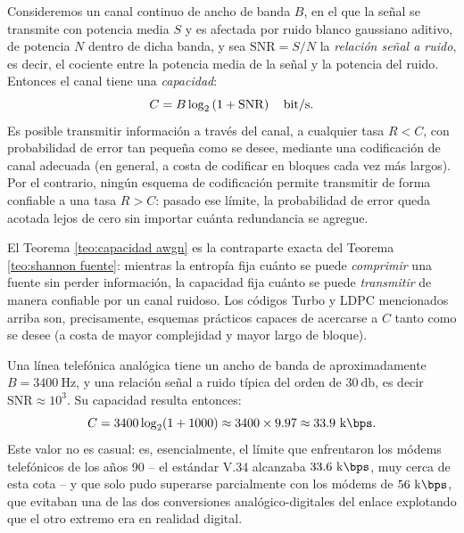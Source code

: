 \begin{teorema}\label{teo:capacidad awgn}
Consideremos un canal continuo de ancho de banda $B$, en el que la señal se transmite con potencia media $S$ y es afectada por ruido blanco gaussiano aditivo, de potencia $N$ dentro de dicha banda, y sea $\mathrm{SNR}=S/N$ la \emph{relación señal a ruido}, es decir, el cociente entre la potencia media de la señal y la potencia del ruido. Entonces el canal tiene una \emph{capacidad}:
\begin{equation*}
    C = B\log_2\left(1+\mathrm{SNR}\right) \quad \unit{\bit/\second}.
\end{equation*}
Es posible transmitir información a través del canal, a cualquier tasa $R<C$, con probabilidad de error tan pequeña como se desee, mediante una codificación de canal adecuada (en general, a costa de codificar en bloques cada vez más largos). Por el contrario, ningún esquema de codificación permite transmitir de forma confiable a una tasa $R>C$: pasado ese límite, la probabilidad de error queda acotada lejos de cero sin importar cuánta redundancia se agregue.
\end{teorema}

El Teorema \ref{teo:capacidad awgn} es la contraparte exacta del Teorema \ref{teo:shannon fuente}: mientras la entropía fija cuánto se puede \emph{comprimir} una fuente sin perder información, la capacidad fija cuánto se puede \emph{transmitir} de manera confiable por un canal ruidoso. Los códigos Turbo y LDPC mencionados arriba son, precisamente, esquemas prácticos capaces de acercarse a $C$ tanto como se desee (a costa de mayor complejidad y mayor largo de bloque).

\begin{ejemplo}\label{ej:capacidad telefonica}
Una línea telefónica analógica tiene un ancho de banda de aproximadamente $B=3400\ \unit{\hertz}$, y una relación señal a ruido típica del orden de $30\ \unit{\decibel}$, es decir $\mathrm{SNR} \approx 10^3$. Su capacidad resulta entonces:
\begin{equation*}
    C = 3400 \log_2(1+1000) \approx 3400 \times 9.97 \approx 33.9\ \unit{\kilo\bps}.
\end{equation*}
Este valor no es casual: es, esencialmente, el límite que enfrentaron los módems telefónicos de los años 90 -- el estándar V.34 alcanzaba $33.6\ \unit{\kilo\bps}$, muy cerca de esta cota -- y que solo pudo superarse parcialmente con los módems de $56\ \unit{\kilo\bps}$, que evitaban una de las dos conversiones analógico-digitales del enlace explotando que el otro extremo era en realidad digital.
\end{ejemplo}

